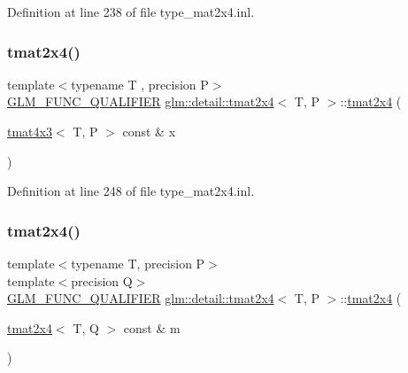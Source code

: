 Definition at line 238 of file type\+\_\+mat2x4.\+inl.

\mbox{\label{structglm_1_1detail_1_1tmat2x4_a535452a34980c66d927256a8c5244fea}} 
\subsubsection{\texorpdfstring{tmat2x4()}{tmat2x4()}\hspace{0.1cm}{\footnotesize\ttfamily [18/22]}}
{\footnotesize\ttfamily template$<$typename T , precision P$>$ \\
\hyperlink{setup_8hpp_a33fdea6f91c5f834105f7415e2a64407}{G\+L\+M\+\_\+\+F\+U\+N\+C\+\_\+\+Q\+U\+A\+L\+I\+F\+I\+ER} \hyperlink{structglm_1_1detail_1_1tmat2x4}{glm\+::detail\+::tmat2x4}$<$ T, P $>$\+::\hyperlink{structglm_1_1detail_1_1tmat2x4}{tmat2x4} (\begin{DoxyParamCaption}\item[{\hyperlink{structglm_1_1detail_1_1tmat4x3}{tmat4x3}$<$ T, P $>$ const \&}]{x }\end{DoxyParamCaption})\hspace{0.3cm}{\ttfamily [explicit]}}



Definition at line 248 of file type\+\_\+mat2x4.\+inl.

\mbox{\label{structglm_1_1detail_1_1tmat2x4_ac1a53a7910b8085b462f623c70252f10}} 
\subsubsection{\texorpdfstring{tmat2x4()}{tmat2x4()}\hspace{0.1cm}{\footnotesize\ttfamily [19/22]}}
{\footnotesize\ttfamily template$<$typename T, precision P$>$ \\
template$<$precision Q$>$ \\
\hyperlink{setup_8hpp_a33fdea6f91c5f834105f7415e2a64407}{G\+L\+M\+\_\+\+F\+U\+N\+C\+\_\+\+Q\+U\+A\+L\+I\+F\+I\+ER} \hyperlink{structglm_1_1detail_1_1tmat2x4}{glm\+::detail\+::tmat2x4}$<$ T, P $>$\+::\hyperlink{structglm_1_1detail_1_1tmat2x4}{tmat2x4} (\begin{DoxyParamCaption}\item[{\hyperlink{structglm_1_1detail_1_1tmat2x4}{tmat2x4}$<$ T, Q $>$ const \&}]{m }\end{DoxyParamCaption})}



